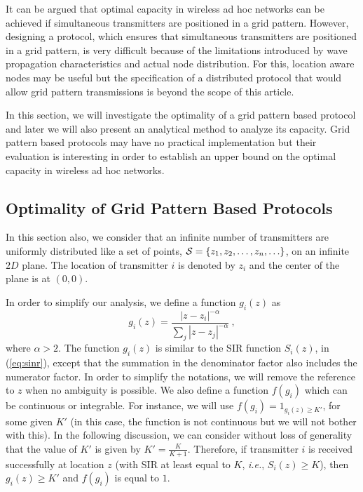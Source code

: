 \documentclass[12pt,english]{article}
\begin{document}
It can be argued that optimal capacity in wireless ad hoc networks can be achieved if simultaneous transmitters are positioned in a grid pattern. However, designing a protocol, which ensures that simultaneous transmitters are positioned in a grid pattern, is very difficult because of the limitations introduced by wave propagation characteristics and actual node distribution. For this, location aware nodes may be useful but the specification of a distributed protocol that would allow grid pattern transmissions is beyond the scope of this article. 

In this section, we will investigate the optimality of a grid pattern based protocol and later we will also present an analytical method to analyze its capacity. Grid pattern based protocols may have no practical implementation but their evaluation is interesting in order to establish an upper bound on the optimal capacity in wireless ad hoc networks.  

\subsection{Optimality of Grid Pattern Based Protocols}
\label{sec:grid_optimality}

In this section also, we consider that an infinite number of transmitters are uniformly distributed like a set of points, \mbox{${\cal S}=\{z_1,z_2,\ldots,z_n,\ldots\}$}, on an infinite $2D$ plane. The location of transmitter $i$ is denoted by $z_i$ and the center of the plane is at $(0,0)$. 

In order to simplify our analysis, we define a function $g_i(z)$ as 
$$
g_i(z)=\frac{|z-z_i|^{-\alpha}}{\sum_{j}|z-z_j|^{-\alpha}}~,
$$ 
where \mbox{$\alpha>2$}. The function $g_i(z)$ is similar to the SIR function $S_i(z)$, in (\ref{eq:sinr}), except that the summation in the denominator factor also includes the numerator factor. In order to simplify the notations, we will remove the reference to $z$ when no ambiguity is possible. 
We also define a function $f(g_i)$ which can be continuous or integrable. For instance, we will use \mbox{$f(g_i)=1_{g_i(z)\geq K'}$}, for some given $K'$ (in this case, the function is not continuous but we will not bother with this). In the following discussion, we can consider without loss of generality that the value of $K'$ is given by \mbox{$K'=\frac{K}{K+1}$}. Therefore, if transmitter $i$ is received successfully at location $z$ (with SIR at least equal to $K$, {\it i.e.}, \mbox{$S_i(z)\geq K$}), then \mbox{$g_i(z)\geq K'$} and $f(g_i)$ is equal to $1$.
\end{document}
